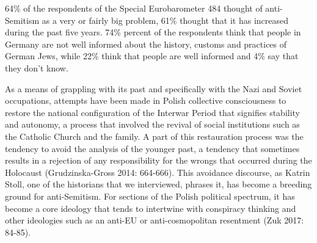 64\% of the respondents of the Special Eurobarometer 484 thought of anti-Semitism as a very or fairly big problem, 61\% thought that it has increased during the past five years. 74\% percent of the respondents think that people in Germany are not well informed about the history, customs and practices of German Jews, while 22\% think that people are well informed and 4\% say that they don't know. \par
As a means of grappling with its past and specifically with the Nazi and Soviet occupations, attempts have been made in Polish collective consciousness to restore the national configuration of the Interwar Period that signifies stability and autonomy, a process that involved the revival of social institutions such as the Catholic Church and the family. A part of this restauration process was the tendency to avoid the analysis of the younger past, a tendency that sometimes results in a rejection of any responsibility for the wrongs that occurred during the Holocaust (Grudzinska-Gross 2014: 664-666). This avoidance discourse, as Katrin Stoll, one of the historians that we interviewed, phrases it, has become a breeding ground for anti-Semitism. For sections of the Polish political spectrum, it has become a core ideology that tends to intertwine with conspiracy thinking and other ideologies such as an anti-EU or anti-cosmopolitan resentment (Zuk 2017: 84-85). \\
